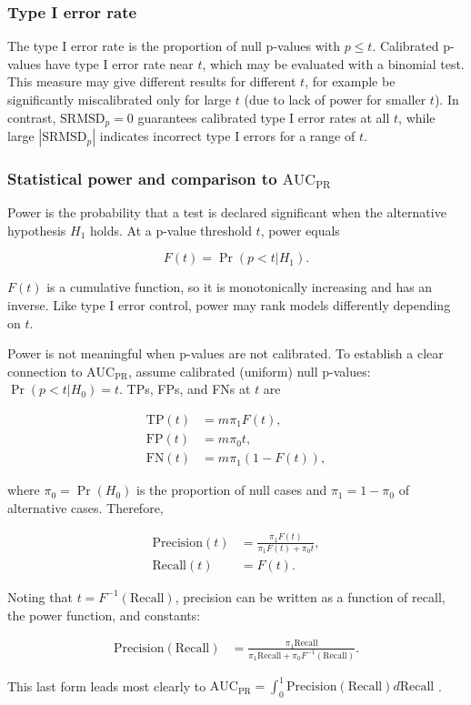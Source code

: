 \documentclass[11pt]{article}
\newcommand{\rmsd}{\text{SRMSD}_p}
\newcommand{\auc}{\text{AUC}_\text{PR}}
\begin{document}
\begin{linenumbers}
\subsubsection{Type I error rate}

The type I error rate is the proportion of null p-values with $p \le t$.
Calibrated p-values have type I error rate near $t$, which may be evaluated with a binomial test.
This measure may give different results for different $t$, for example be significantly miscalibrated only for large $t$ (due to lack of power for smaller $t$).
In contrast, $\rmsd = 0$ guarantees calibrated type I error rates at all $t$, while large $|\rmsd|$ indicates incorrect type I errors for a range of $t$.

\subsubsection{Statistical power and comparison to $\auc$}

Power is the probability that a test is declared significant when the alternative hypothesis $H_1$ holds.
At a p-value threshold $t$, power equals
\begin{linenomath*}
$$
F(t) = \Pr( p < t | H_1 ).
$$
\end{linenomath*}
$F(t)$ is a cumulative function, so it is monotonically increasing and has an inverse.
Like type I error control, power may rank models differently depending on $t$.

Power is not meaningful when p-values are not calibrated.
To establish a clear connection to $\auc$, assume calibrated (uniform) null p-values: $\Pr( p < t | H_0 ) = t$.
TPs, FPs, and FNs at $t$ are
\begin{linenomath*}
\begin{align*}
  \text{TP}(t)
  &=
    m \pi_1 F(t)
    , \\
  \text{FP}(t)
  &=
    m \pi_0 t
    , \\
  \text{FN}(t)
  &=
    m \pi_1 ( 1 - F(t) )
    ,
\end{align*}
\end{linenomath*}
where $\pi_0 = \Pr( H_0 )$ is the proportion of null cases and $\pi_1 = 1 - \pi_0$ of alternative cases.
Therefore, 
\begin{linenomath*}
\begin{align*}
  \text{Precision}(t)
  &=
    \frac{ \pi_1 F(t) }{ \pi_1 F(t) + \pi_0 t }
    , \\
  \text{Recall}(t)
  &=
    F(t)
    .
\end{align*}
\end{linenomath*}
Noting that $t = F^{-1}( \text{Recall} )$, precision can be written as a function of recall, the power function, and constants:
\begin{linenomath*}
\begin{align*}
  \text{Precision}( \text{Recall} )
  &=
    \frac{ \pi_1 \text{Recall} }{ \pi_1 \text{Recall} + \pi_0 F^{-1}( \text{Recall} ) }
    .
\end{align*}
\end{linenomath*}
This last form leads most clearly to
$
\auc
=
\int_0^1 \text{Precision}( \text{Recall} ) d \text{Recall}
$
.


\end{linenumbers}
\end{document}
